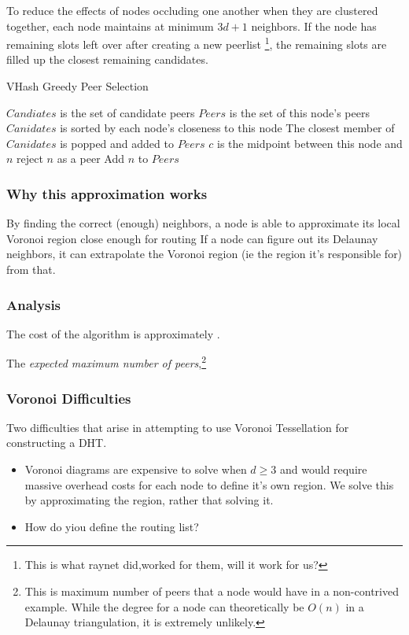 \documentclass{IEEEtran}
\begin{document}
To reduce the effects of nodes occluding one another when they are clustered together, each node maintains at minimum $3d+1$ neighbors.  If the node has remaining slots left over after creating a new peerlist \footnote{This is what raynet did,worked for them, will it work for us?}, the remaining slots are filled up the closest remaining candidates.


\begin{algorithm}
\caption{VHash Greedy Peer Selection}
\label{peer}
\begin{algorithmic}[1]  %
	\STATE $Candiates$ is the set of candidate peers
    \STATE $Peers$ is the set of this node's peers
    \STATE $Canidates$ is sorted by each node's closeness to this node
    \STATE The closest member of $Canidates$ is popped and added to $Peers$
    	\STATE $c$ is the midpoint between this node and $n$
        	\STATE reject $n$ as a peer
        \ELSE
        	\STATE Add $n$ to $Peers$
        \ENDIF
    \ENDFOR
\end{algorithmic}
\end{algorithm}


\subsubsection{Why this approximation works}
By finding the correct (enough) neighbors, a node is able to approximate its local Voronoi region close enough for routing
If a node can figure out its Delaunay neighbors, it can extrapolate the Voronoi region (ie the region it's responsible for) from that. 


\subsubsection{Analysis}
The cost of the algorithm is approximately .

The \textit{expected maximum number of peers},\footnote{This is maximum number of peers that a node would have in a non-contrived example.  While the degree for a node can theoretically be $O(n)$ in a Delaunay triangulation, it is extremely unlikely.}

\subsubsection{Voronoi Difficulties}
Two difficulties that arise in attempting to use Voronoi Tessellation for constructing a DHT.
\begin{itemize}
	\item Voronoi diagrams are expensive to solve when $d \geq 3$ and would require massive overhead costs for each node to define it's own region.  We solve this by approximating the region, rather that solving it.
	\item How do yiou define the routing list?
\end{itemize}
\end{document}
